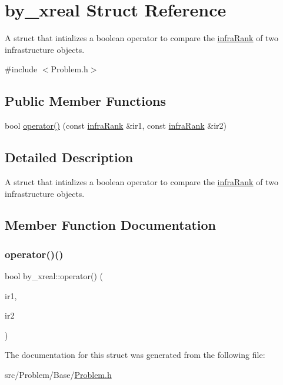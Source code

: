 \hypertarget{structby__xreal}{}\section{by\+\_\+xreal Struct Reference}
\label{structby__xreal}


A struct that intializes a boolean operator to compare the \mbox{\hyperlink{structinfraRank}{infra\+Rank}} of two infrastructure objects.  




{\ttfamily \#include $<$Problem.\+h$>$}

\subsection*{Public Member Functions}
\begin{DoxyCompactItemize}
\item 
bool \mbox{\hyperlink{structby__xreal_a89543fd1eb21d028c20e4cd01a239b71}{operator()}} (const \mbox{\hyperlink{structinfraRank}{infra\+Rank}} \&ir1, const \mbox{\hyperlink{structinfraRank}{infra\+Rank}} \&ir2)
\end{DoxyCompactItemize}


\subsection{Detailed Description}
A struct that intializes a boolean operator to compare the \mbox{\hyperlink{structinfraRank}{infra\+Rank}} of two infrastructure objects. 

\subsection{Member Function Documentation}
\mbox{\label{structby__xreal_a89543fd1eb21d028c20e4cd01a239b71}} 
\subsubsection{\texorpdfstring{operator()()}{operator()()}}
{\footnotesize\ttfamily bool by\+\_\+xreal\+::operator() (\begin{DoxyParamCaption}\item[{const \mbox{\hyperlink{structinfraRank}{infra\+Rank}} \&}]{ir1,  }\item[{const \mbox{\hyperlink{structinfraRank}{infra\+Rank}} \&}]{ir2 }\end{DoxyParamCaption})\hspace{0.3cm}{\ttfamily [inline]}}



The documentation for this struct was generated from the following file\+:\begin{DoxyCompactItemize}
\item 
src/\+Problem/\+Base/\mbox{\hyperlink{Problem_8h}{Problem.\+h}}\end{DoxyCompactItemize}
